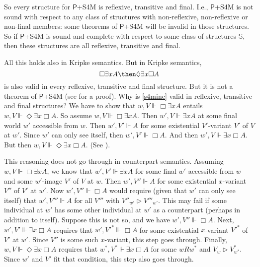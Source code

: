 \documentclass[11pt]{woarticle}
\theoremstyle{break}
\theoremstyle{nonumberplain}
\newcommand{\s}[1]{\ensuremath{\mathsf{#1}}}
\newcommand{\SAT}{\Vdash}
\newcommand{\Img}{\triangleright}
\newcommand{\1}{\;\,|\;\,}
\begin{document}
{So every structure for \s{P}+S4M is reflexive, transitive and
final. I.e., \s{P}+S4M is not sound with respect to any class of
structures with non-reflexive, non-reflexive or non-final members:
some theorems of \s{P}+S4M will be invalid in those structures. So if
\s{P}+S4M is sound and complete with respect to some class of
structures $\mathbb{S}$, then these structures are all reflexive,
transitive and final.

All this holds also in Kripke semantics. But in Kripke semantics,
\begin{equation}\label{s4minc}
  \Box\exists x A \then \Diamond \exists x\Box A
\end{equation}
is also valid in every reflexive, transitive and final structure. But
it is not a theorem of \s{P}+S4M (see \cite[266--270]{hughes96new} for
a proof). Why is \eqref{s4minc} valid in reflexive, transitive and
final structures? We have to show that $w,V \SAT \Box\exists x A$
entails $w,V \SAT \Diamond\exists x\Box A$. So assume $w,V\SAT
\Box\exists x A$. Then $w',V \SAT \exists x A$ at some final world
$w'$ accessible from $w$. Then $w',V' \SAT A$ for some existential
$V'$-variant $V'$ of $V$ at $w'$. Since $w'$ can only see itself, then
$w',V' \SAT \Box A$. And then $w',V \SAT \exists x \Box A$. But then
$w,V \SAT \Diamond \exists x \Box A$. (See
\cite[266,283]{hughes96new}).

This reasoning does not go through in counterpart semantics. Assuming
$w,V\SAT \Box\exists x A$, we know that $w',V' \SAT \exists x A$ for
some final $w'$ accessible from $w$ and some $w'$-image $V'$ of $V$ at
$w$. Then $w',V'' \SAT A$ for some existential $x$-variant $V''$ of
$V'$ at $w'$. Now $w',V'' \SAT \Box A$ would require (given that $w'$
can only see itself) that $w',V''' \SAT A$ for all $V'''$ with
$V''_{w'} \Img V'''_{w'}$. This may fail if some individual at $w'$
has some other individual at $w'$ as a counterpart (perhaps in
addition to itself). Suppose this is not so, and we have $w',V'' \SAT
\Box A$. Next, $w',V'\SAT \exists x \Box A$ requires that $w',V'^*
\SAT \Box A$ for some existential $x$-variant $V'^*$ of $V'$ at
$w'$. Since $V''$ is some such $x$-variant, this step goes
through. Finally, $w,V \SAT \Diamond \exists x \Box A$ requires that
$w^*,V^* \SAT \exists x \Box A$ for some $wRw^*$ and $V_w \Img
V^*_{w^*}$. Since $w'$ and $V'$ fit that condition, this step also
goes through.

}
\end{document}
